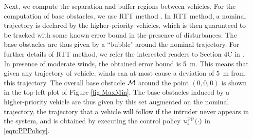 Next, we compute the separation and buffer regions between vehicles. For the computation of base obstacles, we use RTT method \cite{Bansal2017}. In RTT method, a nominal trajectory is declared by the higher-priority vehicles, which is then guaranteed to be tracked with some known error bound in the presence of disturbances. The base obstacles are thus given by a ``bubble" around the nominal trajectory. For further details of RTT method, we refer the interested readers to Section 4C in \cite{Bansal2017}. In presence of moderate winds, the obtained error bound is \SI{5}{\m}. This means that given any trajectory of vehicle, winds can at most cause a deviation of \SI{5}{\m} from this trajectory. The overall base obstacle $\mathcal{M}$ around the point $(0, 0, 0)$ is shown in the top-left plot of Figure \ref{fig:MaxMin}. The base obstacles induced by a higher-priority vehicle are thus given by this set augmented on the nominal trajectory, the trajectory that a vehicle will follow if the intruder never appears in the system, and is obtained by executing the control policy ${u^{\text{PP}}_{i}}(\cdot)$ in \eqref{eqn:PPPolicy}.

